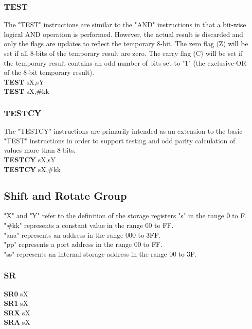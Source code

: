         \subsubsection{TEST}
            The "TEST" instructions are similar to the "AND" instructions in that a bit-wise logical AND operation is performed. However, the actual result is discarded and
            only the flags are updates to reflect the temporary 8-bit. The zero flag (Z) will be set if all 8-bits of the temporary result are zero.
            The carry flag (C) will be set if the temporary result contains an odd number of bits set to "1" (the exclusive-OR of the 8-bit temporary result).\\
                \textbf{TEST} sX,sY\\
                \textbf{TEST} sX,\#kk\\

        \subsubsection{TESTCY}
            The "TESTCY" instructions are primarily intended as an extension to the basic "TEST" instructions in order to support testing and odd parity calculation of
            values more than 8-bits.\\
            \textbf{TESTCY} sX,sY\\
            \textbf{TESTCY} sX,\#kk\\

        \subsection{Shift and Rotate Group}
            "X" and "Y" refer to the definition of the storage registers "s" in the range 0 to F.\\
            "\#kk" represents a constant value in the range 00 to FF.\\
            "aaa" represents an address in the range 000 to 3FF.\\
            "pp" represents a port address in the range 00 to FF.\\
            "ss" represents an internal storage address in the range 00 to 3F.\\
            \subsubsection{SR}
                \textbf{SR0} sX\\
                \textbf{SR1} sX\\
                \textbf{SRX} sX\\
                \textbf{SRA} sX\\
